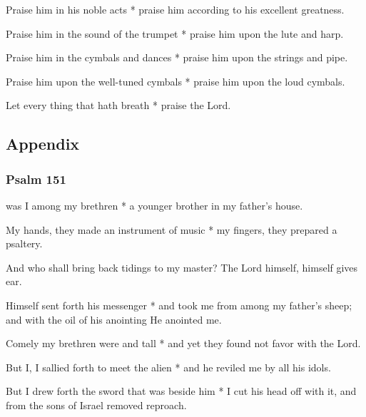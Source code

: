 Praise him in his noble acts * praise him according to his excellent greatness.

Praise him in the sound of the trumpet * praise him upon the lute and harp.

Praise him in the cymbals and dances * praise him upon the strings and pipe.

Praise him upon the well-tuned cymbals * praise him upon the loud cymbals.

Let every thing that hath breath * praise the Lord.
\subsection{Appendix}

\subsubsection{Psalm 151}


 was I among my brethren * a younger brother in my father’s house.

My hands, they made an instrument of music * my fingers, they prepared a psaltery.

And who shall bring back tidings to my master? The Lord himself, himself gives ear.

Himself sent forth his messenger * and took me from among my father’s sheep; and with the oil of his anointing He anointed me.

Comely my brethren were and tall * and yet they found not favor with the Lord.

But I, I sallied forth to meet the alien * and he reviled me by all his idols.

But I drew forth the sword that was beside him * I cut his head off with it, and from the sons of Israel removed reproach.
